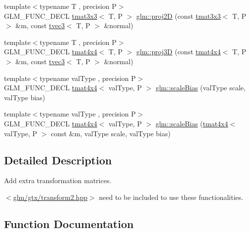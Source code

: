 \begin{DoxyCompactItemize}
\item 
{\footnotesize template$<$typename T , precision P$>$ }\\G\+L\+M\+\_\+\+F\+U\+N\+C\+\_\+\+D\+E\+CL \hyperlink{structglm_1_1tmat3x3}{tmat3x3}$<$ T, P $>$ \hyperlink{group__gtx__transform2_gacfce1085167a8bfb71a55ea14d22752f}{glm\+::proj2D} (const \hyperlink{structglm_1_1tmat3x3}{tmat3x3}$<$ T, P $>$ \&m, const \hyperlink{structglm_1_1tvec3}{tvec3}$<$ T, P $>$ \&normal)
\item 
{\footnotesize template$<$typename T , precision P$>$ }\\G\+L\+M\+\_\+\+F\+U\+N\+C\+\_\+\+D\+E\+CL \hyperlink{structglm_1_1tmat4x4}{tmat4x4}$<$ T, P $>$ \hyperlink{group__gtx__transform2_gafab0418f2503ec2133cb2de828cc482a}{glm\+::proj3D} (const \hyperlink{structglm_1_1tmat4x4}{tmat4x4}$<$ T, P $>$ \&m, const \hyperlink{structglm_1_1tvec3}{tvec3}$<$ T, P $>$ \&normal)
\item 
{\footnotesize template$<$typename val\+Type , precision P$>$ }\\G\+L\+M\+\_\+\+F\+U\+N\+C\+\_\+\+D\+E\+CL \hyperlink{structglm_1_1tmat4x4}{tmat4x4}$<$ val\+Type, P $>$ \hyperlink{group__gtx__transform2_ga2874abd228989556d610a0bff993667a}{glm\+::scale\+Bias} (val\+Type scale, val\+Type bias)
\item 
{\footnotesize template$<$typename val\+Type , precision P$>$ }\\G\+L\+M\+\_\+\+F\+U\+N\+C\+\_\+\+D\+E\+CL \hyperlink{structglm_1_1tmat4x4}{tmat4x4}$<$ val\+Type, P $>$ \hyperlink{group__gtx__transform2_gac1a1139e2980021422d1fc1c42dc74f2}{glm\+::scale\+Bias} (\hyperlink{structglm_1_1tmat4x4}{tmat4x4}$<$ val\+Type, P $>$ const \&m, val\+Type scale, val\+Type bias)
\end{DoxyCompactItemize}


\subsection{Detailed Description}
Add extra transformation matrices. 

$<$\hyperlink{transform2_8hpp}{glm/gtx/transform2.\+hpp}$>$ need to be included to use these functionalities. 

\subsection{Function Documentation}
\mbox{\label{group__gtx__transform2_gacfce1085167a8bfb71a55ea14d22752f}} 
